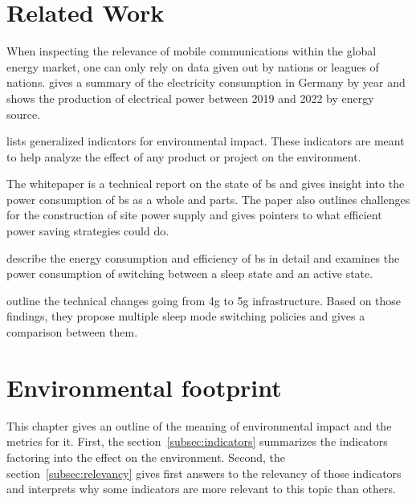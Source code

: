 \documentclass[11pt,a4paper]{article}
\begin{document}
\section{Related Work}\label{sec:relatedwork}

When inspecting the relevance of mobile communications within the global energy market, one can only rely on data given out by nations or leagues of nations.
\citep{Stromverbrauch} gives a summary of the electricity consumption in Germany by year and \citep{Bruttostromerzeugung} shows the production of electrical power between 2019 and 2022 by energy source.

\citep{Umweltindikatoren} lists generalized indicators for environmental impact.
These indicators are meant to help analyze the effect of any product or project on the environment.

The whitepaper \citep{powerwhitepaper} is a technical report on the state of \acrfull{bs} and gives insight into the power consumption of \acrshort{bs} as a whole and parts.
The paper also outlines challenges for the construction of site power supply and gives pointers to what efficient power saving strategies could do.

\citep{5GEfficiencyOverview} describe the energy consumption and efficiency of \acrshort{bs} in detail and examines the power consumption of switching between a sleep state and an active state.

\citep{DynamicSleepModeControl} outline the technical changes going from \acrshort{4g} to \acrfull{5g} infrastructure.
Based on those findings, they propose multiple sleep mode switching policies and gives a comparison between them.

\section{Environmental footprint}\label{sec:energyfootprint}
This chapter gives an outline of the meaning of environmental impact and the metrics for it.
First, the section~\ref{subsec:indicators} summarizes the indicators factoring into the effect on the environment.
Second, the section~\ref{subsec:relevancy} gives first answers to the relevancy of those indicators and interprets why some indicators are more relevant to this topic than others.
\end{document}
